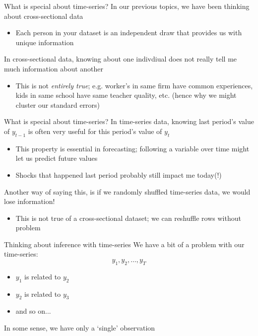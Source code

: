 \documentclass[aspectratio=169,t,11pt,table]{beamer}
\begin{document}

\begin{frame}{What is special about time-series?}
  In our previous topics, we have been thinking about \alert{cross-sectional} data
  \begin{itemize}
    \item Each person in your dataset is an independent draw that provides us with unique information
  \end{itemize}

  \bigskip
  In cross-sectional data, knowing about one indivdiual does not really tell me much information about another
  \begin{itemize}
    \item This is not \emph{entirely true}; e.g. worker's in same firm have common experiences, kids in same school have same teacher quality, etc. (hence why we might cluster our standard errors)
  \end{itemize}
\end{frame}

\begin{frame}{What is special about time-series?}
  In time-series data, knowing last period's value of $y_{t-1}$ is often very useful for this period's value of $y_{t}$
  \begin{itemize}
    \item This property is essential in forecasting; following a variable over time might let us predict future values
    
    \item Shocks that happened last period probably still impact me today(!) 
  \end{itemize}

  \pause
  \bigskip
  Another way of saying this, is if we randomly shuffled time-series data, we would lose information!
  \begin{itemize}
    \item This is not true of a cross-sectional dataset; we can reshuffle rows without problem 
  \end{itemize}
\end{frame}


\begin{frame}{Thinking about inference with time-series}
  We have a bit of a problem with our time-series:
  $$
    y_1, y_2, \dots, y_T
  $$
  \vspace*{-\bigskipamount}
  \begin{itemize}
    \item $y_1$ is related to $y_2$ 
    \item $y_2$ is related to $y_3$
    \item and so on...
  \end{itemize}

  \bigskip
  In some sense, we have only a `single' observation 
\end{frame}
\end{document}
